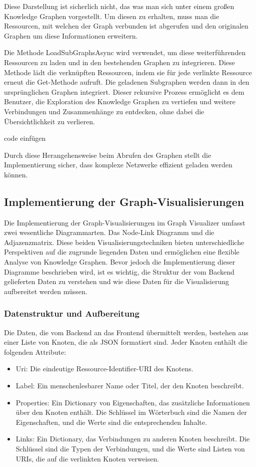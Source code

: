 Diese Darstellung ist sicherlich nicht, das was man sich unter einem großen Knowledge Graphen vorgestellt. Um diesen zu erhalten, muss man die Ressourcen, mit welchen der Graph verbunden ist abgerufen und den originalen Graphen um diese Informationen erweitern.

Die Methode LoadSubGraphsAsync wird verwendet, um diese weiterführenden Ressourcen zu laden und in den bestehenden Graphen zu integrieren. Diese Methode lädt die verknüpften Ressourcen, indem sie für jede verlinkte Ressource erneut die Get-Methode aufruft. Die geladenen Subgraphen werden dann in den ursprünglichen Graphen integriert. Dieser rekursive Prozess ermöglicht es dem Benutzer, die Exploration des Knowledge Graphen zu vertiefen und weitere Verbindungen und Zusammenhänge zu entdecken, ohne dabei die Übersichtlichkeit zu verlieren.

code einfügen

Durch diese Herangehensweise beim Abrufen des Graphen stellt die Implementierung sicher, dass komplexe Netzwerke effizient geladen werden können.

\subsection{Implementierung der Graph-Visualisierungen}
\label{realization:implementation:graphDrawing}

Die Implementierung der Graph-Visualisierungen im Graph Visualizer umfasst zwei wesentliche Diagrammarten. Das Node-Link Diagramm und die Adjazenzmatrix. Diese beiden Visualisierungstechniken bieten unterschiedliche Perspektiven auf die zugrunde liegenden Daten und ermöglichen eine flexible Analyse von Knowledge Graphen. Bevor jedoch die Implementierung dieser Diagramme beschrieben wird, ist es wichtig, die Struktur der vom Backend gelieferten Daten zu verstehen und wie diese Daten für die Visualisierung aufbereitet werden müssen.

\subsubsection{Datenstruktur und Aufbereitung}

Die Daten, die vom Backend an das Frontend übermittelt werden, bestehen aus einer Liste von Knoten, die als JSON formatiert sind. Jeder Knoten enthält die folgenden Attribute:

\begin{itemize}
    \item Uri: Die eindeutige Ressource-Identifier-URI des Knotens.
    \item Label: Ein menschenlesbarer Name oder Titel, der den Knoten beschreibt.
    \item Properties: Ein Dictionary von Eigenschaften, das zusätzliche Informationen über den Knoten enthält. Die Schlüssel im Wörterbuch sind die Namen der Eigenschaften, und die Werte sind die entsprechenden Inhalte.
    \item Links: Ein Dictionary, das Verbindungen zu anderen Knoten beschreibt. Die Schlüssel sind die Typen der Verbindungen, und die Werte sind Listen von URIs, die auf die verlinkten Knoten verweisen.
\end{itemize}

